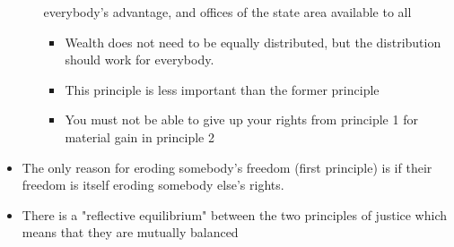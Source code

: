 \documentclass[11pt]{article}
\begin{document}
\begin{itemize}
\begin{itemize}
everybody's advantage, and offices of the state area available to all
\begin{itemize}
\item Wealth does not need to be equally distributed, but the distribution should
work for everybody.
\item This principle is less important than the former principle
\item You must not be able to give up your rights from principle 1 for material
gain in principle 2
\end{itemize}
\end{itemize}
\item The only reason for eroding somebody's freedom (first principle) is if their
freedom is itself eroding somebody else's rights.
\item There is a "reflective equilibrium" between the two principles of justice
which means that they are mutually balanced
\end{itemize}
\end{document}
